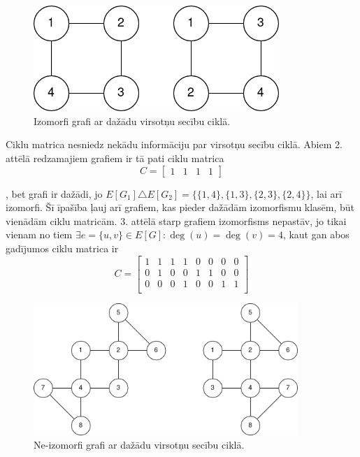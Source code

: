 \documentclass[12pt, a4paper]{article}
\begin{document}
\begin{figure}[h!]
    \centering
    \includegraphics[height=4cm]{vertex-order.png}
    \caption{Izomorfi grafi ar dažādu virsotņu secību ciklā.}
\end{figure}


Ciklu matrica nesniedz nekādu informāciju par virsotņu secību ciklā. Abiem 2. attēlā redzamajiem grafiem ir tā pati ciklu matrica 
$$C=\begin{bmatrix}
    1 & 1 & 1 & 1
\end{bmatrix}$$

, bet grafi ir dažādi, jo $E[G_1] \triangle E[G_2] = \lbrace
\lbrace 1, 4\rbrace,
\lbrace 1, 3\rbrace,
\lbrace 2, 3\rbrace,
\lbrace 2, 4\rbrace
\rbrace$, lai arī izomorfi. Šī īpašība ļauj arī grafiem, kas pieder dažādām izomorfismu klasēm, būt vienādām ciklu matricām. 3. attēlā starp grafiem izomorfisms nepastāv, jo tikai vienam no tiem $\exists e = \lbrace u, v \rbrace \in E[G] : \deg(u) = \deg(v) = 4 $, kaut gan abos gadījumos ciklu matrica ir $$ 
C=\begin{bmatrix}
    1 & 1 & 1 & 1 & 0 & 0 & 0 & 0 \\
    0 & 1 & 0 & 0 & 1 & 1 & 0 & 0 \\
    0 & 0 & 0 & 1 & 0 & 0 & 1 & 1 \\
    
\end{bmatrix}
$$

\begin{figure}[h!]
    \centering
    \includegraphics[height=5cm]{not-isomorphic.png}
    \caption{Ne-izomorfi grafi ar dažādu virsotņu secību ciklā.}
\end{figure}
\end{document}
